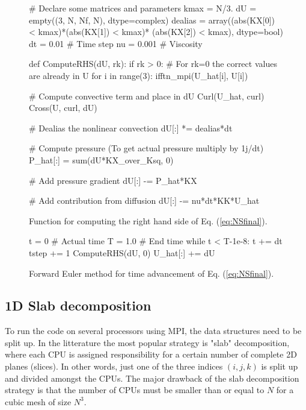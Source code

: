 \documentclass[11pt, oneside]{article}
\begin{document}
\begin{figure}[h!]
\begin{python}
# Declare some matrices and parameters
kmax = N/3.
dU = empty((3, N, Nf, N), dtype=complex)
dealias = array((abs(KX[0]) < kmax)*(abs(KX[1]) < kmax)*
                (abs(KX[2]) < kmax), dtype=bool)
dt = 0.01    # Time step
nu = 0.001   # Viscosity

def ComputeRHS(dU, rk):
    if rk > 0: # For rk=0 the correct values are already in U
        for i in range(3):
            ifftn_mpi(U_hat[i], U[i])

    # Compute convective term and place in dU
    Curl(U_hat, curl)
    Cross(U, curl, dU)

    # Dealias the nonlinear convection
    dU[:] *= dealias*dt

    # Compute pressure (To get actual pressure multiply by 1j/dt)
    P_hat[:] = sum(dU*KX_over_Ksq, 0)

    # Add pressure gradient
    dU[:] -= P_hat*KX

    # Add contribution from diffusion
    dU[:] -= nu*dt*KK*U_hat

\end{python}
\caption{Function for computing the right hand side of Eq. (\ref{eq:NSfinal}).}
\label{fig:computeRHS}
\end{figure}

\begin{figure}
\begin{python}
t = 0        # Actual time
T = 1.0      # End time
while t < T-1e-8:
    t += dt
    tstep += 1
    ComputeRHS(dU, 0)
    U_hat[:] += dU
\end{python}
\caption{Forward Euler method for time advancement of Eq. (\ref{eq:NSfinal}).}
\label{fig:FEuler}
\end{figure}

\subsection{1D Slab decomposition}
To run the code on several processors using MPI, the data structures need to be split up. In the litterature the most popular strategy is "slab" decomposition, where each CPU is assigned responsibility for a certain number of complete 2D planes (slices). In other words, just one of the three indices $(i,j,k)$ is split up and divided amongst the CPUs. The major drawback of the slab decomposition strategy is that the number of CPUs must be smaller than or equal to $N$ for a cubic mesh of size $N^3$.
\end{document}
